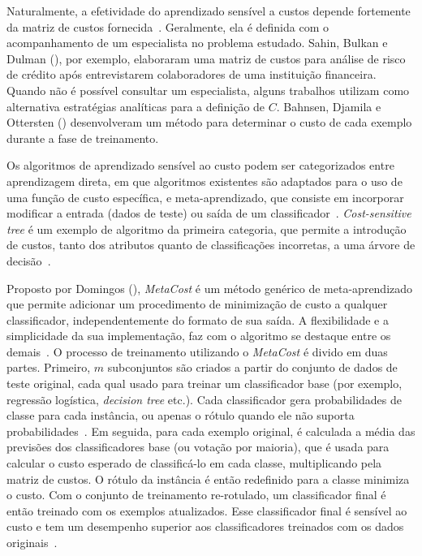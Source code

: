 Naturalmente, a efetividade do aprendizado sensível a custos depende fortemente da matriz de custos fornecida~\cite{FernndezCs2018}. Geralmente, ela é definida com o acompanhamento de um especialista no problema estudado. Sahin, Bulkan e Dulman (\citeyear{Sahin2013}), por exemplo, elaboraram uma matriz de custos para análise de risco de crédito após entrevistarem colaboradores de uma instituição financeira. Quando não é possível consultar um especialista, alguns trabalhos utilizam como alternativa estratégias analíticas para a definição de \(C\). Bahnsen, Djamila e Ottersten (\citeyear{Bahnsen2015}) desenvolveram um método para determinar o custo de cada exemplo durante a fase de treinamento.

Os algoritmos de aprendizado sensível ao custo podem ser categorizados entre aprendizagem direta, em que algoritmos existentes são adaptados para o uso de uma função de custo específica, e meta-aprendizado, que consiste em incorporar modificar a entrada (dados de teste) ou saída de um classificador~\cite{FernndezCs2018}. \textit{Cost-sensitive tree} é um exemplo de algoritmo da primeira categoria, que permite a introdução de custos, tanto dos atributos quanto de classificações incorretas, a uma árvore de decisão~\cite{Ling2006}.

Proposto por Domingos (\citeyear{Domingos1999}), \textit{MetaCost} é um método genérico de meta-aprendizado que permite adicionar um procedimento de minimização de custo a qualquer classificador, independentemente do formato de sua saída. A flexibilidade e a simplicidade da sua implementação, faz com o algoritmo se destaque entre os demais~\cite[text]{FernndezCs2018, Wang2018}. O processo de treinamento utilizando o \textit{MetaCost} é divido em duas partes. Primeiro, \(m\) subconjuntos são criados a partir do conjunto de dados de teste original, cada qual usado para treinar um classificador base (por exemplo, regressão logística, \textit{decision tree} etc.). Cada classificador gera probabilidades de classe para cada instância, ou apenas o rótulo quando ele não suporta probabilidades~\cite{Araf2024}. Em seguida, para cada exemplo original, é calculada a média das previsões dos classificadores base (ou votação por maioria), que é usada para calcular o custo esperado de classificá-lo em cada classe, multiplicando pela matriz de custos. O rótulo da instância é então redefinido para a classe minimiza o custo. Com o conjunto de treinamento re-rotulado, um classificador final é então treinado com os exemplos atualizados. Esse classificador final é sensível ao custo e tem um desempenho superior aos classificadores treinados com os dados originais~\cite{Chen2021}.

